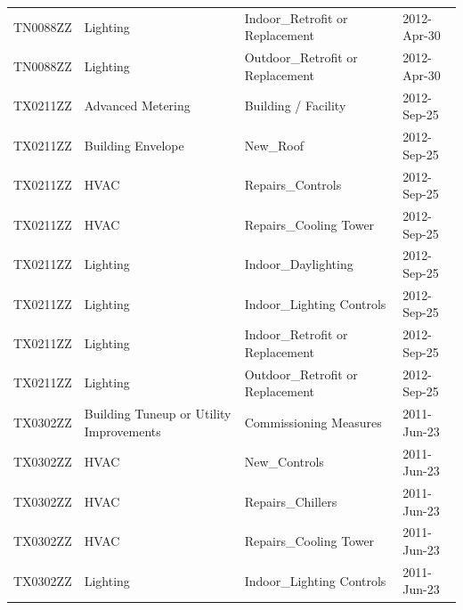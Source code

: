 \documentclass[12pt]{article}
\begin{document}
\begin{longtable}{lp{4cm}p{4cm}p{3cm}}
TN0088ZZ         & Lighting                                & Indoor\_Retrofit or Replacement           & 2012-Apr-30                   \\
TN0088ZZ         & Lighting                                & Outdoor\_Retrofit or Replacement          & 2012-Apr-30                   \\
TX0211ZZ         & Advanced Metering                       & Building / Facility                       & 2012-Sep-25                   \\
TX0211ZZ         & Building Envelope                       & New\_Roof                                 & 2012-Sep-25                   \\
TX0211ZZ         & HVAC                                    & Repairs\_Controls                         & 2012-Sep-25                   \\
TX0211ZZ         & HVAC                                    & Repairs\_Cooling Tower                    & 2012-Sep-25                   \\
TX0211ZZ         & Lighting                                & Indoor\_Daylighting                       & 2012-Sep-25                   \\
TX0211ZZ         & Lighting                                & Indoor\_Lighting Controls                 & 2012-Sep-25                   \\
TX0211ZZ         & Lighting                                & Indoor\_Retrofit or Replacement           & 2012-Sep-25                   \\
TX0211ZZ         & Lighting                                & Outdoor\_Retrofit or Replacement          & 2012-Sep-25                   \\
TX0302ZZ         & Building Tuneup or Utility Improvements & Commissioning Measures                    & 2011-Jun-23                   \\
TX0302ZZ         & HVAC                                    & New\_Controls                             & 2011-Jun-23                   \\
TX0302ZZ         & HVAC                                    & Repairs\_Chillers                         & 2011-Jun-23                   \\
TX0302ZZ         & HVAC                                    & Repairs\_Cooling Tower                    & 2011-Jun-23                   \\
TX0302ZZ         & Lighting                                & Indoor\_Lighting Controls                 & 2011-Jun-23                   \\

\end{longtable}
\end{document}
